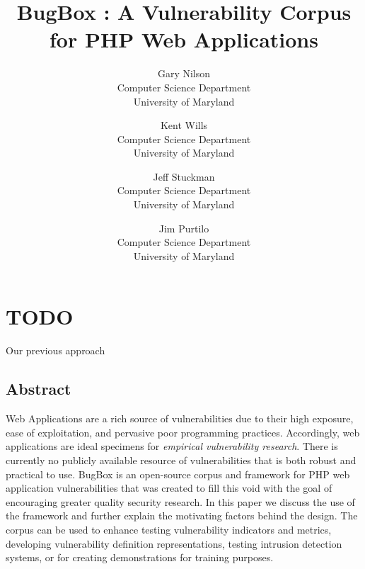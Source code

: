 \documentclass[letterpaper,twocolumn,10pt]{article}
\begin{document}
\date{}


\title{\Large \bf BugBox : A Vulnerability Corpus for PHP Web Applications}


\author{
{\rm Gary Nilson}\\
Computer Science Department\\University of Maryland
\and
{\rm Kent Wills}\\
Computer Science Department\\University of Maryland
\and
{\rm Jeff Stuckman}\\
Computer Science Department\\University of Maryland
\and
{\rm Jim Purtilo}\\
Computer Science Department\\University of Maryland
} %

\maketitle

\thispagestyle{empty}

\section{TODO}
Our previous approach

\subsection*{Abstract}
Web Applications are a rich source of vulnerabilities due to their high exposure, ease of exploitation, and pervasive poor programming practices. Accordingly, web applications are ideal specimens for \emph{empirical vulnerability research}. There is currently no publicly available resource of vulnerabilities that is both robust and practical to use. BugBox is an open-source corpus and framework for PHP web application vulnerabilities that was created to fill this void with the goal of encouraging greater quality security research. In this paper we discuss the use of the framework and further explain the motivating factors behind the design. The corpus can be used to enhance testing vulnerability indicators and metrics, developing vulnerability definition representations, testing intrusion detection systems, or for creating demonstrations for training purposes.  
\end{document}
